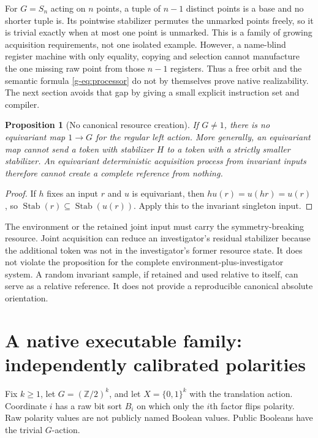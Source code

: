 \documentclass[11pt]{article}
\newtheorem{proposition}[theorem]{Proposition}
\theoremstyle{definition}
\theoremstyle{remark}
\newcommand{\Stab}{\operatorname{Stab}}
\begin{document}
For $G=S_n$ acting on $n$ points, a tuple of $n-1$ distinct points is a base and no shorter tuple is. Its pointwise stabilizer permutes the unmarked points freely, so it is trivial exactly when at most one point is unmarked. This is a family of growing acquisition requirements, not one isolated example. However, a name-blind register machine with only equality, copying and selection cannot manufacture the one missing raw point from those $n-1$ registers. Thus a free orbit and the semantic formula \eqref{g-eq:processor} do not by themselves prove native realizability. The next section avoids that gap by giving a small explicit instruction set and compiler.

\begin{proposition}[No canonical resource creation]\label{g-prop:no-reference}
If $G\ne1$, there is no equivariant map $1\to G$ for the regular left action. More generally, an equivariant map cannot send a token with stabilizer $H$ to a token with a strictly smaller stabilizer. An equivariant deterministic acquisition process from invariant inputs therefore cannot create a complete reference from nothing.
\end{proposition}
\begin{proof}
If $h$ fixes an input $r$ and $u$ is equivariant, then $h u(r)=u(hr)=u(r)$, so $\Stab(r)\subseteq\Stab(u(r))$. Apply this to the invariant singleton input.\end{proof}

The environment or the retained joint input must carry the symmetry-breaking resource. Joint acquisition can reduce an investigator's residual stabilizer because the additional token was not in the investigator's former resource state. It does not violate the proposition for the complete environment-plus-investigator system. A random invariant sample, if retained and used relative to itself, can serve as a relative reference. It does not provide a reproducible canonical absolute orientation.

\section{A native executable family: independently calibrated polarities}\label{g-sec:compiler}
Fix $k\geq1$, let $G=(\mathbb Z/2)^k$, and let $X=\{0,1\}^k$ with the translation action. Coordinate $i$ has a raw bit sort $B_i$ on which only the $i$th factor flips polarity. Raw polarity values are not publicly named Boolean values. Public Booleans have the trivial $G$-action.
\end{document}
